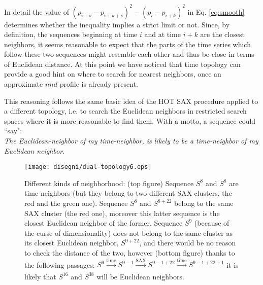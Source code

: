 \documentclass[a4paper,twoside]{article}
\begin{document}
%
In detail the value of $(p_{i+s} - p_{i+k+s})^2 - (p_i-p_{i+k})^2$ in Eq. \ref{eq:smooth} determines whether the inequality implies a strict limit or not. Since, by definition, the sequences beginning at time $i$ and at time $i+k$ are the closest neighbors, it seems reasonable to expect that the parts of the time series which follow these two sequences might resemble each other and thus be close in terms of Euclidean distance. At this point we have noticed that time topology can provide a good hint on where to search for nearest neighbors, once an approximate $nnd$ profile is already present.

This reasoning follows the same basic idea of the HOT SAX procedure applied to a different topology, i.e. to search the Euclidean neighbors in restricted search spaces where it is more reasonable to find them. 
%
With a motto, a sequence could ``say":\\

\textit{The Euclidean-neighbor of my time-neighbor, is likely to be a time-neighbor of my Euclidean neighbor}. \\

\begin{figure}[h!]
\texttt{[image: disegni/dual-topology6.eps]}
\caption{Different kinds of neighborhood: (top figure) Sequence $S^{8}$ and $S^{8}$ are time-neighbors (but they belong to two different SAX clusters, the red and the green one). Sequence $S^{8}$ and $S^{8+22}$ belong to the same SAX cluster (the red one), moreover this latter sequence is the closest Euclidean neighbor of the former. Sequence $S^{9}$ (because of the curse of dimensionality) does not belong to the same cluster as its closest Euclidean neighbor, $S^{9+22}$, and there would be no reason to check the distance of the two, however (bottom figure) thanks to the following passages: 
$S^{9} 
\xrightarrow[]{\text{time}} 
S^{9-1}
\xrightarrow[]{\text{SAX}}
S^{9-1+22}
\xrightarrow[]{\text{time}}
S^{9-1+22+1}
$
%
it is likely that $S^{16}$ and $S^{38}$ will be Euclidean neighbors.
%
%
}\label{fig:topology}
\end{figure}
\end{document}
